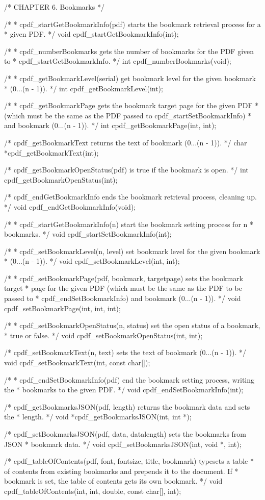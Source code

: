 /* CHAPTER 6. Bookmarks */

/*
 * cpdf_startGetBookmarkInfo(pdf) starts the bookmark retrieval process for a
 * given PDF.
 */
void cpdf_startGetBookmarkInfo(int);

/*
 * cpdf_numberBookmarks gets the number of bookmarks for the PDF given to
 * cpdf_startGetBookmarkInfo.
 */
int cpdf_numberBookmarks(void);

/*
 * cpdf_getBookmarkLevel(serial) get bookmark level for the given bookmark
 * (0...(n - 1)).
 */
int cpdf_getBookmarkLevel(int);

/*
 * cpdf_getBookmarkPage gets the bookmark target page for the given PDF
 * (which must be the same as the PDF passed to cpdf_startSetBookmarkInfo)
 * and bookmark (0...(n - 1)).
 */
int cpdf_getBookmarkPage(int, int);

/* cpdf_getBookmarkText returns the text of bookmark (0...(n - 1)). */
char *cpdf_getBookmarkText(int);

/* cpdf_getBookmarkOpenStatus(pdf) is true if the bookmark is open. */
int cpdf_getBookmarkOpenStatus(int);

/* cpdf_endGetBookmarkInfo ends the bookmark retrieval process, cleaning up. */
void cpdf_endGetBookmarkInfo(void);

/*
 * cpdf_startGetBookmarkInfo(n) start the bookmark setting process for n
 * bookmarks.
 */
void cpdf_startSetBookmarkInfo(int);

/*
 * cpdf_setBookmarkLevel(n, level) set bookmark level for the given bookmark
 * (0...(n - 1)).
 */
void cpdf_setBookmarkLevel(int, int);

/*
 * cpdf_setBookmarkPage(pdf, bookmark, targetpage) sets the bookmark target
 * page for the given PDF (which must be the same as the PDF to be passed to
 * cpdf_endSetBookmarkInfo) and bookmark (0...(n - 1)).
 */
void cpdf_setBookmarkPage(int, int, int);

/*
 * cpdf_setBookmarkOpenStatus(n, status) set the open status of a bookmark,
 * true or false.
 */
void cpdf_setBookmarkOpenStatus(int, int);

/* cpdf_setBookmarkText(n, text) sets the text of bookmark (0...(n - 1)). */
void cpdf_setBookmarkText(int, const char[]);

/*
 * cpdf_endSetBookmarkInfo(pdf) end the bookmark setting process, writing the
 * bookmarks to the given PDF.
 */
void cpdf_endSetBookmarkInfo(int);

/* cpdf_getBookmarksJSON(pdf, length) returns the bookmark data and sets the
 * length. */
void *cpdf_getBookmarksJSON(int, int *);

/* cpdf_setBookmarksJSON(pdf, data, datalength) sets the bookmarks from JSON
 * bookmark data. */
void cpdf_setBookmarksJSON(int, void *, int);

/* cpdf_tableOfContents(pdf, font, fontsize, title, bookmark) typesets a table
 * of contents from existing bookmarks and prepends it to the document. If
 * bookmark is set, the table of contents gets its own bookmark. */
void cpdf_tableOfContents(int, int, double, const char[], int);

